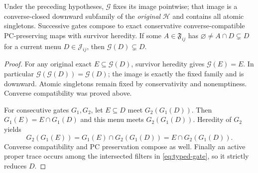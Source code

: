 \begin{lemma}
\label{lem:typed-gate-image}
Under the preceding hypotheses, $\mathcal G$ fixes its image
pointwise; that image is a converse-closed downward subfamily of the
\emph{original} $\mathcal H$ and contains all atomic singletons.
Successive gates compose to exact conservative converse-compatible
PC-preserving maps with survivor heredity.  If some
$A\in\mathfrak F_{ij}$ has
$\varnothing\ne A\cap D\subsetneq D$ for a current menu
$D\in\mathcal J_{ij}$, then $\mathcal G(D)\subsetneq D$.
\end{lemma}
\begin{proof}
For any original exact $E\subseteq\mathcal G(D)$, survivor
heredity gives $\mathcal G(E)=E$.  In particular
$\mathcal G(\mathcal G(D))=\mathcal G(D)$; the image is exactly
the fixed family and is downward.  Atomic singletons remain fixed by
conservativity and nonemptiness.  Converse compatibility was proved
above.

For consecutive gates $G_1,G_2$, let $E\subseteq D$ meet
$G_2(G_1(D))$.  Then $G_1(E)=E\cap G_1(D)$ and this menu meets
$G_2(G_1(D))$.  Heredity of $G_2$ yields
\[
 G_2(G_1(E))=G_1(E)\cap G_2(G_1(D))
               =E\cap G_2(G_1(D)).
\]
Converse compatibility and PC preservation compose as well.
Finally an active proper trace occurs among the intersected filters
in \eqref{eq:typed-gate}, so it strictly reduces $D$.
\end{proof}

